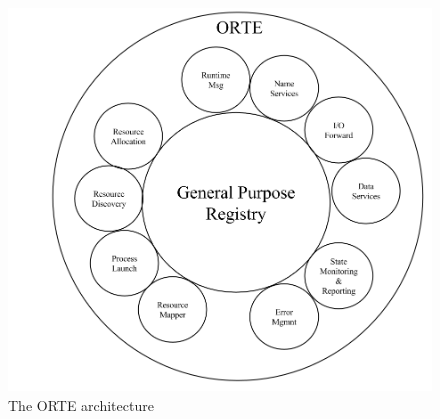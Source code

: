 \begin{figure}[ht]
\centering
\includegraphics[scale=0.43]{images/orte.png}
\caption[The ORTE architecture]{The ORTE architecture}
\label{fig:orte-architecture}
\end{figure}


